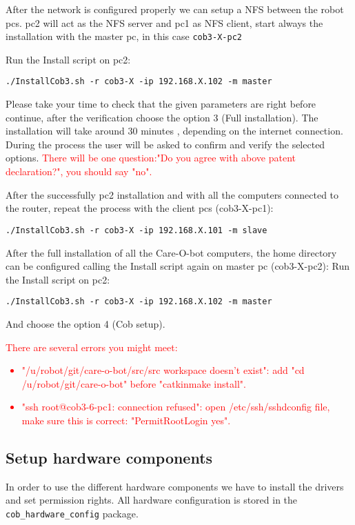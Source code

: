 After the network is configured properly we can setup a NFS between the robot pcs. pc2 will act as the NFS server and pc1 as NFS client, start always the installation with the master pc, in this case \texttt{cob3-X-pc2}

Run the Install script on pc2:
\begin{lstlisting}
./InstallCob3.sh -r cob3-X -ip 192.168.X.102 -m master
\end{lstlisting}

Please take your time to check that the given parameters are right before continue, after the verification choose the option 3 (Full installation). The installation will take around 30 minutes , depending on the internet connection. During the process the user will be asked to confirm and verify the selected options. 
\textcolor{red}{There will be one question:"Do you agree with above patent declaration?", you should say "no".}

After the successfully pc2 installation and with all the computers connected to the router, repeat the process with the client pcs (cob3-X-pc1):

\begin{lstlisting}
./InstallCob3.sh -r cob3-X -ip 192.168.X.101 -m slave
\end{lstlisting}

After the full installation of all the Care-O-bot computers, the home directory can be configured calling the Install script again on master pc (cob3-X-pc2):
Run the Install script on pc2:
\begin{lstlisting}
./InstallCob3.sh -r cob3-X -ip 192.168.X.102 -m master
\end{lstlisting}

And choose the option 4 (Cob setup). \newline
\textcolor{red}{There are several errors you might meet:
\begin{itemize}
\item "/u/robot/git/care-o-bot/src/src workspace doesn't exist": add  "cd /u/robot/git/care-o-bot" before "catkin\underline{\space}make install".
\item "ssh root@cob3-6-pc1: connection refused": open /etc/ssh/sshd\underline{\space}config file, make sure this is correct: "PermitRootLogin yes".
\end{itemize}
}

\subsection{Setup hardware components}
In order to use the different hardware components we have to install the drivers and set permission rights. All hardware configuration is stored in the \texttt{cob\_hardware\_config} package.

